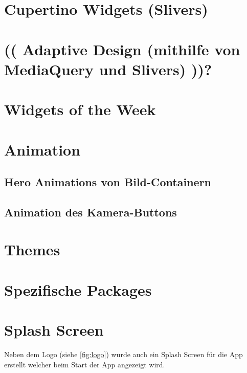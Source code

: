 \section{Cupertino Widgets (Slivers)}


\section{(( Adaptive Design (mithilfe von MediaQuery und Slivers) ))?}


\section{Widgets of the Week}


\section{Animation}


\subsection{Hero Animations von Bild-Containern}


\subsection{Animation des Kamera-Buttons}


\section{Themes}


\section{Spezifische Packages}


\section{Splash Screen}
Neben dem Logo (siehe \ref{fig:logo}) wurde auch ein Splash Screen für die App erstellt welcher beim Start der App angezeigt wird.